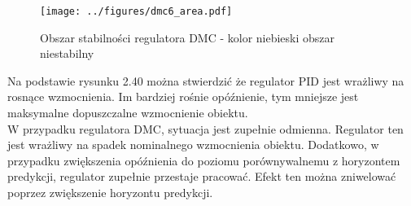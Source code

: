 \documentclass[a4paper,titlepage,11pt,floatssmall]{mwrep}
\begin{document}
\begin{figure}[H]
\centering
\texttt{[image: ../figures/dmc6\_area.pdf]}
\caption{Obszar stabilności regulatora DMC - kolor niebieski obszar niestabilny}
\end{figure}

Na podstawie rysunku 2.40 można stwierdzić że regulator PID jest wrażliwy na rosnące wzmocnienia. Im bardziej rośnie opóźnienie, tym mniejsze jest maksymalne dopuszczalne wzmocnienie obiektu.\\

W przypadku regulatora DMC, sytuacja jest zupełnie odmienna. Regulator ten jest wrażliwy na spadek nominalnego wzmocnienia obiektu. Dodatkowo, w przypadku zwiększenia opóźnienia do poziomu porównywalnemu z horyzontem predykcji, regulator zupełnie przestaje pracować. Efekt ten można zniwelować poprzez zwiększenie horyzontu predykcji.
\end{document}
